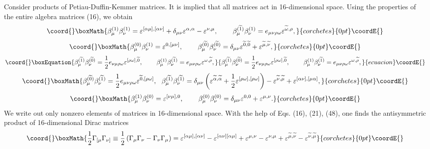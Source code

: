 \documentclass[a4paper,12pt]{article}
\begin{document}
Consider products of Petiau-Duffin-Kemmer matrices. It is implied
that all matrices act in 16-dimensional space. Using the
properties of the entire algebra matrices (16), we obtain
\[\coord{}\boxMath{
\beta _\mu ^{(1)}\beta _\nu ^{(1)}=\varepsilon ^{[\alpha\mu]
,[\alpha \nu]} + \delta_{\mu\nu}\varepsilon^{\alpha,\alpha}
-\varepsilon ^{\nu ,\mu } ,\hspace{0.3in} \beta _\mu
^{(\widetilde{1})}\beta _\nu ^{(1)}=e_{\mu \nu \rho \omega
}\varepsilon ^{\widetilde{\omega },\rho} ,
}{corchetes}{0pt}\coordE{}\]
\[\coord{}\boxMath{
\beta _\mu ^{(0)}\beta _\nu ^{(1)}=\varepsilon ^{0,[\mu\nu]}
,\hspace{0.3in}\beta _\mu ^{(\widetilde{0})}\beta _\nu
^{(\widetilde{0})}=\delta_{\mu\nu}\varepsilon^{\widetilde{0},\widetilde{0}}
+\varepsilon ^{\widetilde{\mu },\widetilde{\nu }} ,
}{corchetes}{0pt}\coordE{}\]
\begin{equation}\coord{}\boxEquation{
\beta _\mu ^{(\widetilde{1})}\beta _\nu
^{(\widetilde{0})}=\frac{1}{2}e_{\nu\mu \rho \omega }\varepsilon
^{ [\rho\omega],\widetilde{0}} ,\hspace{0.3in}\beta _\mu
^{(1)}\beta _\nu ^{(\widetilde{1})}=e_{\mu\nu\rho \omega
}\varepsilon ^{\omega,\widetilde{\rho}} ,\label{96}
}{
\beta _\mu ^{(\widetilde{1})}\beta _\nu
^{(\widetilde{0})}=\frac{1}{2}e_{\nu\mu \rho \omega }\varepsilon
^{ [\rho\omega],\widetilde{0}} ,\hspace{0.3in}\beta _\mu
^{(1)}\beta _\nu ^{(\widetilde{1})}=e_{\mu\nu\rho \omega
}\varepsilon ^{\omega,\widetilde{\rho}} ,}{ecuacion}\coordE{}\end{equation}
\[\coord{}\boxMath{
\beta _\mu ^{(\widetilde{0})}\beta _\nu
^{(\widetilde{1})}=\frac{1}{2}e_{ \mu\nu \rho \omega }\varepsilon
^{\widetilde{0},[\rho\omega]} ,~~\beta _\mu
^{(\widetilde{1})}\beta _\nu ^{(\widetilde{1})}= \delta_{\mu\nu}
\left(\varepsilon^{\widetilde{\alpha},\widetilde{\alpha}} +
\frac{1}{2}\varepsilon ^{[\rho\omega],[\rho\omega]} \right)-
\varepsilon^{\widetilde{\nu},\widetilde{\mu}} + \varepsilon
^{[\alpha\nu],[\mu\alpha]} ,
}{corchetes}{0pt}\coordE{}\]
\[\coord{}\boxMath{
\beta _\mu ^{(1)}\beta _\nu ^{(0)}=\varepsilon ^{[\nu\mu] ,0}
,\hspace{0.3in}\beta _\mu ^{(0)}\beta _\nu ^{(0)}=\delta_{\mu\nu}
\varepsilon^{0,0} + \varepsilon ^{\mu,\nu} .
}{corchetes}{0pt}\coordE{}\]
We write out only nonzero elements of matrices in 16-dimensional
space. With the help of Eqs. (16), (21), (48), one finds the
antisymmetric product of 16-dimensional Dirac matrices
\[\coord{}\boxMath{
\frac{1}{2}\Gamma_{[\mu} \Gamma _{\nu
]}\equiv\frac{1}{2}\left(\Gamma_\mu \Gamma _\nu -\Gamma_\nu \Gamma
_\mu \right)=\varepsilon ^{[\alpha\mu],[\alpha\nu]}- \varepsilon
^{[\alpha\nu][ \alpha\mu]} +\varepsilon ^{\mu,\nu}-\varepsilon
^{\nu,\mu} + \varepsilon^{\widetilde{\mu},\widetilde{\nu}} -
\varepsilon^{\widetilde{\nu},\widetilde{\mu}}
}{corchetes}{0pt}\coordE{}\]
\end{document}
